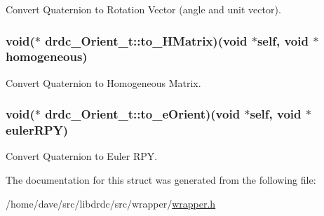 Convert Quaternion to Rotation Vector (angle and unit vector). 

\hypertarget{structdrdc__Orient__t_b491fbe468cbc5c75e372ffe0e0a632f}{
\subsubsection[to\_\-HMatrix]{\setlength{\rightskip}{0pt plus 5cm}void($\ast$ {\bf drdc\_\-Orient\_\-t::to\_\-HMatrix})(void $\ast$self, void $\ast$homogeneous)}}
\label{structdrdc__Orient__t_b491fbe468cbc5c75e372ffe0e0a632f}


Convert Quaternion to Homogeneous Matrix. 

\hypertarget{structdrdc__Orient__t_900b9c9b0a700211ad1305f9eeb89dc0}{
\subsubsection[to\_\-eOrient]{\setlength{\rightskip}{0pt plus 5cm}void($\ast$ {\bf drdc\_\-Orient\_\-t::to\_\-eOrient})(void $\ast$self, void $\ast$eulerRPY)}}
\label{structdrdc__Orient__t_900b9c9b0a700211ad1305f9eeb89dc0}


Convert Quaternion to Euler RPY. 



The documentation for this struct was generated from the following file:\begin{CompactItemize}
\item 
/home/dave/src/libdrdc/src/wrapper/\hyperlink{wrapper_8h}{wrapper.h}\end{CompactItemize}
